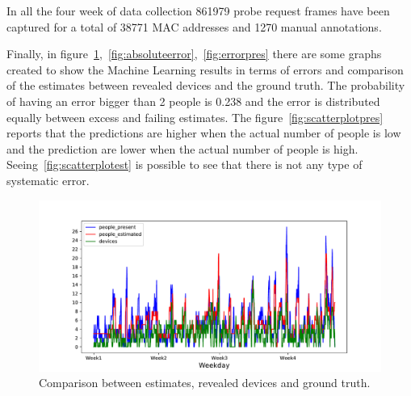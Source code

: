 In all the four week of data collection 861979 probe request frames have been captured for a total of 38771 MAC addresses and 1270 manual annotations.


Finally, in figure~\ref{fig:comparison},~\ref{fig:absoluteerror},~\ref{fig:errorpres} there are some graphs created to show the Machine Learning results in terms of errors and comparison of the estimates between revealed devices and the ground truth. The probability of having an error bigger than 2 people is 0.238 and the error is distributed equally between excess and failing estimates. The figure~\ref{fig:scatterplotpres} reports that the predictions are higher when the actual number of people is low and the prediction are lower when the actual number of people is high. Seeing~\ref{fig:scatterplotest} is possible to see that there is not any type of systematic error.

\begin{figure}[H]
\centering 
\includegraphics[width=1\textwidth]{images/comparison} 
\caption{Comparison between estimates, revealed devices and ground truth.}
\label{fig:comparison}
\end{figure}



